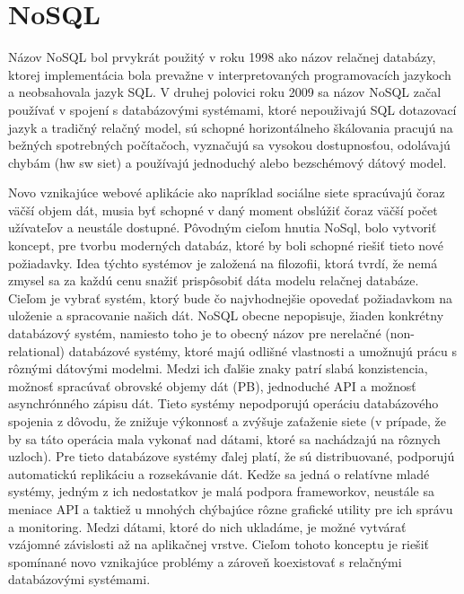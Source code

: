 \documentclass[11pt,twoside,a4paper]{book}
\begin{document}



\chapter{NoSQL}

Názov NoSQL bol prvykrát použitý v roku 1998 ako názov relačnej databázy, ktorej implementácia bola prevažne v interpretovaných programovacích jazykoch a neobsahovala jazyk SQL. V druhej polovici roku 2009 \cite{nosqlGoogle} sa názov NoSQL začal používať v spojení s databázovými systémami, ktoré nepouživajú SQL dotazovací jazyk a tradičný relačný model, sú schopné horizontálneho škálovania pracujú na bežných spotrebných počítačoch, vyznačujú sa vysokou dostupnosťou, odolávajú chybám (hw sw siet) a používajú jednoduchý alebo bezschémový dátový model.

Novo vznikajúce webové aplikácie ako napríklad sociálne siete spracúvajú čoraz väčší objem dát, musia byť schopné v daný moment obslúžiť čoraz väčší počet užívateľov a neustále dostupné. Pôvodným cieľom hnutia NoSql, bolo vytvoriť koncept, pre tvorbu moderných databáz, ktoré by boli schopné riešiť tieto nové požiadavky. Idea týchto systémov je založená na filozofii, ktorá tvrdí, že nemá zmysel sa za každú cenu snažiť prispôsobiť dáta modelu relačnej databáze. Cieľom je vybrať systém, ktorý bude čo najvhodnejšie opovedať požiadavkom na uloženie a spracovanie našich dát. NoSQL obecne nepopisuje, žiaden konkrétny databázový systém, namiesto toho je to obecný názov pre nerelačné (non-relational) databázové systémy, ktoré majú odlišné vlastnosti a umožnujú prácu s rôznými dátovými modelmi. Medzi ich ďalšie znaky patrí slabá konzistencia, možnosť spracúvať obrovské objemy dát (PB), jednoduché API a možnosť asynchrónného zápisu dát. Tieto systémy nepodporujú operáciu databázového spojenia z dôvodu, že znižuje výkonnosť a zvýšuje zaťaženie siete (v prípade, že by sa táto operácia mala vykonať nad dátami, ktoré sa nachádzajú na rôznych uzloch). Pre tieto databázove systémy ďalej platí, že sú distribuované, podporujú automatickú replikáciu a rozsekávanie dát. Kedže sa jedná o relatívne mladé systémy, jedným z ich nedostatkov je malá podpora frameworkov, neustále sa meniace API a taktiež u mnohých chýbajúce rôzne grafické utility pre ich správu a monitoring. Medzi dátami, ktoré do nich ukladáme, je možné vytvárať vzájomné závislosti až na aplikačnej vrstve. Cieľom tohoto konceptu je riešiť spomínané novo vznikajúce problémy a zároveň koexistovať s relačnými databázovými  systémami.
\end{document}
